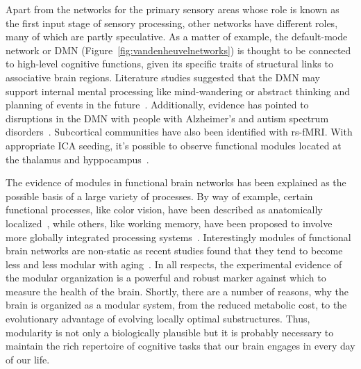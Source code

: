 Apart from the networks for the primary sensory areas whose role is known as the first input stage of sensory processing, other networks have different roles, many of which are partly speculative.
As a matter of example, the default-mode network or DMN (Figure~\ref{fig:vandenheuvelnetworks}) is thought to be connected to high-level cognitive functions, given its specific traits of structural links to associative brain regions.
Literature studies suggested that the DMN may support internal mental processing like mind-wandering or abstract thinking and planning of events in the future~\cite{gusnard2001,buckner2008}. Additionally, evidence has pointed to disruptions in the DMN with people with Alzheimer's and autism spectrum disorders~\cite{buckner2008,washington2014}.
Subcortical communities have also been identified with rs-fMRI. With appropriate ICA seeding, it's possible to observe functional modules located at the thalamus and hyppocampus~\cite{lee2012,nicolini2016}.

The evidence of modules in functional brain networks has been explained as the possible basis of a large variety of processes. By way of example, certain functional processes, like color vision, have been described as anatomically localized~\cite{zeki1998}, while others, like working memory, have been proposed to involve more globally integrated processing systems~\cite{baddeley2003}.
Interestingly modules of functional brain networks are non-static as recent studies found that they tend to become less and less modular with aging~\cite{meunier2009a}. In all respects, the experimental evidence of the modular organization is a powerful and robust marker against which to measure the health of the brain. 
Shortly, there are a number of reasons, why the brain is organized as a modular system, from the reduced metabolic cost, to the evolutionary advantage of evolving locally optimal substructures.
Thus, modularity is not only a biologically plausible but it is probably necessary to maintain the rich repertoire of cognitive tasks that our brain engages in every day of our life.

